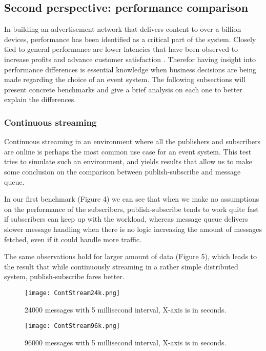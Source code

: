 \documentclass[conference]{IEEEtran}
\begin{document}
\subsection{Second perspective: performance comparison}
In building an advertisement network that delivers content to over a billion devices, performance has been identified as a critical part of the system. Closely tied to general performance are lower latencies that have been observed to increase profits and advance customer satisfaction \cite{latencyprofit}. Therefor having insight into performance differences is essential knowledge when business decisions are being made regarding the choice of an event system.
The following subsections will present concrete benchmarks and give a brief analysis on each one to better explain the differences.
\\

\subsubsection{Continuous streaming}
Continuous streaming in an environment where all the publishers and subscribers are online is perhaps the most common use case for an event system. This test tries to simulate such an environment, and yields results that allow us to make some conclusion on the comparison  between publish-subscribe and message queue.

In our first benchmark (Figure 4) we can see that when we make no assumptions on the performance of the subscribers, publish-subscribe tends to work quite fast if subscribers can keep up with the workload, whereas message queue delivers slower message handling when there is no logic increasing the amount of messages fetched, even if it could handle more traffic.

The same observations hold for larger amount of data (Figure 5), which leads to the result that while continuously streaming in a rather simple distributed system, publish-subscribe fares better.

\begin{figure}[!t]
    \centering
    \texttt{[image: ContStream24k.png]}
    \caption{24000 messages with 5 millisecond interval, X-axis is in seconds.}
\end{figure}

\begin{figure}[!t]
    \centering
    \texttt{[image: ContStream96k.png]}
    \caption{96000 messages with 5 millisecond interval, X-axis is in seconds.}
\end{figure}
\end{document}
